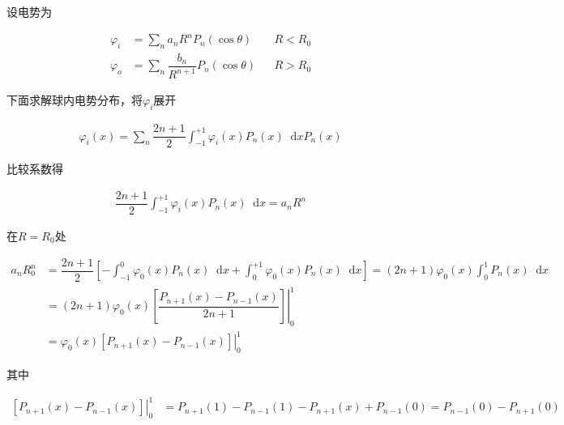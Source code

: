 \documentclass{article}
\newcommand*{\md}{\mathop{}\!\mathrm{d}}
\begin{document}
设电势为

\begin{equation*}
  \begin{aligned}
    \varphi_i &= \sum_n a_n R^n P_n \left( \cos \theta \right) && R<R_0 \\
    \varphi_o &= \sum_n \dfrac{b_n}{R^{n+1}} P_n \left( \cos \theta \right) && R>R_0 
  \end{aligned}
\end{equation*}

下面求解球内电势分布，将$\varphi_i$展开

\begin{equation*}
  \begin{aligned}
    \varphi_i \left( x \right) = \sum_n \dfrac{2n+1}{2} \int_{-1}^{+1} \varphi_i \left( x \right) P_n \left( x \right) \md x P_n \left( x \right) 
  \end{aligned}
\end{equation*}

比较系数得

\begin{equation*}
  \begin{aligned}
    \dfrac{2n+1}{2} \int_{-1}^{+1} \varphi_i \left( x \right) P_n \left( x \right) \md x
    = a_n R^n
  \end{aligned}
\end{equation*}

在$R=R_0$处

\begin{equation*}
  \begin{aligned}
    a_n R_0^n &=
    \dfrac{2n+1}{2} \left[ - \int_{-1}^{0} \varphi_0 \left( x \right) P_n \left( x \right) \md x + \int_{0}^{+1} \varphi_0 \left( x \right) P_n \left( x \right) \md x \right]
    = \left( 2n+1 \right) \varphi_0 \left( x \right) \int_0^1 P_n \left( x \right) \md x \\
    &= \left( 2n+1 \right) \varphi_0 \left( x \right) \left. \left[ \dfrac{P_{n+1} \left( x \right) - P_{n-1} \left( x \right)}{2n+1} \right] \right|_0^1 \\
    &= \varphi_0 \left( x \right) \left. \left[  P_{n+1} \left( x \right) - P_{n-1} \left( x \right) \right] \right|_0^1
  \end{aligned}
\end{equation*}

其中

\begin{equation*}
  \begin{aligned}
    \left. \left[  P_{n+1} \left( x \right) - P_{n-1} \left( x \right) \right] \right|_0^1
    &= P_{n+1} \left( 1 \right) - P_{n-1} \left( 1 \right) - P_{n+1} \left( x \right) + P_{n-1} \left( 0 \right) = P_{n-1} \left( 0 \right) - P_{n+1} \left( 0 \right) 
  \end{aligned}
\end{equation*}
\end{document}
